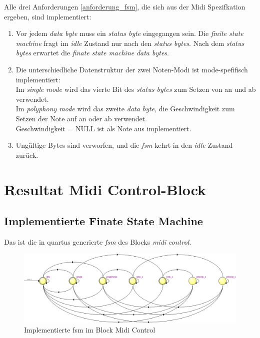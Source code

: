 Alle drei Anforderungen \ref{anforderung_fsm}, die sich aus der Midi Spezifkation ergeben, sind implementiert:
\begin{enumerate}
	\item Vor jedem \textit{data byte} muss ein \textit{status byte} eingegangen sein. Die \textit{finite state machine} fragt im \textit{idle} Zustand nur nach den \textit{status bytes}. Nach dem \textit{status bytes} erwartet die \textit{finate state machine} \textit{data bytes}. 
	\item Die unterschiedliche Datenstruktur der zwei Noten-Modi ist mode-spefifisch implementiert:\\
Im \textit{single mode} wird das vierte Bit des \textit{status bytes} zum Setzen von an und ab verwendet.\\
Im \textit{polyphony mode} wird das zweite \textit{data byte}, die Geschwindigkeit zum Setzen der Note auf an oder ab verwendet. \\ Geschwindigkeit = NULL ist als Note aus implementiert.\\
	\item Ungültige Bytes sind verworfen, und die \textit{fsm }kehrt in den   \textit{idle} Zustand zurück.
\end{enumerate}


\newpage
\section{Resultat Midi Control-Block}\label{sect.midi_resultat}

\subsection{Implementierte Finate State Machine}
Das ist die in quartus generierte \textit{fsm} des Blocks \textit{midi control}.
\begin{figure}[H]
	\includegraphics[width=1\textwidth]{images/midi_control/fsm_midicontrol.png}
	\caption{Implementierte fsm im Block Midi Control}
	\label{fig.midi_fsm_quartus_}
\end{figure}


